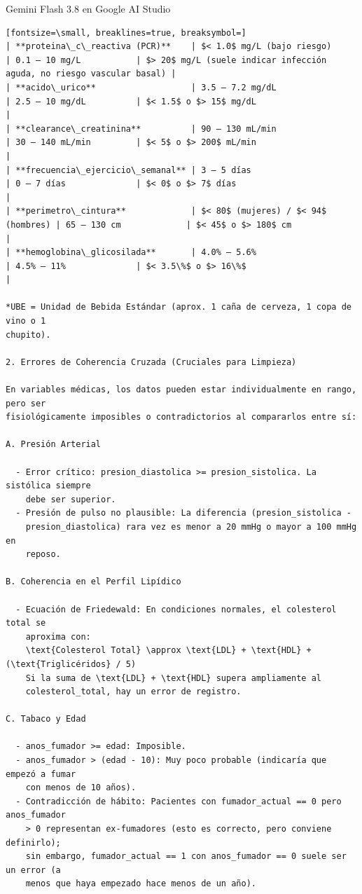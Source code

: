 \documentclass[12pt,a4paper,oneside]{book}
\begin{document}
\begin{iaresp}{Gemini Flash 3.8 en Google AI Studio}
\begin{Verbatim}[fontsize=\small, breaklines=true, breaksymbol=]
| **proteina\_c\_reactiva (PCR)**    | $< 1.0$ mg/L (bajo riesgo)          | 0.1 – 10 mg/L           | $> 20$ mg/L (suele indicar infección aguda, no riesgo vascular basal) |
| **acido\_urico**                   | 3.5 – 7.2 mg/dL                     | 2.5 – 10 mg/dL          | $< 1.5$ o $> 15$ mg/dL                                                |
| **clearance\_creatinina**          | 90 – 130 mL/min                     | 30 – 140 mL/min         | $< 5$ o $> 200$ mL/min                                                |
| **frecuencia\_ejercicio\_semanal** | 3 – 5 días                          | 0 – 7 días              | $< 0$ o $> 7$ días                                                    |
| **perimetro\_cintura**             | $< 80$ (mujeres) / $< 94$ (hombres) | 65 – 130 cm             | $< 45$ o $> 180$ cm                                                   |
| **hemoglobina\_glicosilada**       | 4.0% – 5.6%                         | 4.5% – 11%              | $< 3.5\%$ o $> 16\%$                                                  |

*UBE = Unidad de Bebida Estándar (aprox. 1 caña de cerveza, 1 copa de vino o 1
chupito).

2. Errores de Coherencia Cruzada (Cruciales para Limpieza)

En variables médicas, los datos pueden estar individualmente en rango, pero ser
fisiológicamente imposibles o contradictorios al compararlos entre sí:

A. Presión Arterial

  - Error crítico: presion_diastolica >= presion_sistolica. La sistólica siempre
    debe ser superior.
  - Presión de pulso no plausible: La diferencia (presion_sistolica -
    presion_diastolica) rara vez es menor a 20 mmHg o mayor a 100 mmHg en
    reposo.

B. Coherencia en el Perfil Lipídico

  - Ecuación de Friedewald: En condiciones normales, el colesterol total se
    aproxima con:
    \text{Colesterol Total} \approx \text{LDL} + \text{HDL} + (\text{Triglicéridos} / 5)
    Si la suma de \text{LDL} + \text{HDL} supera ampliamente al
    colesterol_total, hay un error de registro.

C. Tabaco y Edad

  - anos_fumador >= edad: Imposible.
  - anos_fumador > (edad - 10): Muy poco probable (indicaría que empezó a fumar
    con menos de 10 años).
  - Contradicción de hábito: Pacientes con fumador_actual == 0 pero anos_fumador
    > 0 representan ex-fumadores (esto es correcto, pero conviene definirlo);
    sin embargo, fumador_actual == 1 con anos_fumador == 0 suele ser un error (a
    menos que haya empezado hace menos de un año).


\end{Verbatim}
\end{iaresp}
\end{document}
